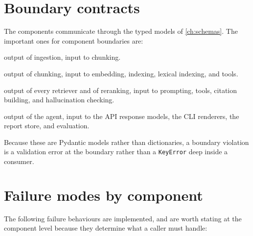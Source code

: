 \section{Boundary contracts}

The components communicate through the typed models of
\cref{ch:schemas}. The important ones for component boundaries are:

\begin{description}[nosep]
  \item[\texttt{FeedbackRecord}] output of ingestion, input to chunking.
  \item[\texttt{DocumentChunk}] output of chunking, input to embedding,
    indexing, lexical indexing, and tools.
  \item[\texttt{SearchResult}] output of every retriever and of reranking,
    input to prompting, tools, citation building, and hallucination checking.
  \item[\texttt{AgentAnswer}] output of the agent, input to the API response
    models, the CLI renderers, the report store, and evaluation.
\end{description}

Because these are Pydantic models rather than dictionaries, a boundary
violation is a validation error at the boundary rather than a \texttt{KeyError}
deep inside a consumer.

\section{Failure modes by component}

The following failure behaviours are implemented, and are worth stating at the
component level because they determine what a caller must handle:

